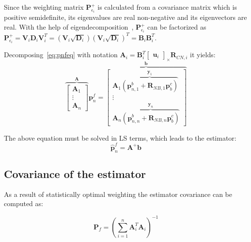 Since the weighting matrix $\mathbf{P}_{\epsilon_i}^{+}$ is calculated from a covariance matrix which is positive semidefinite, its eigenvalues are real non-negative and its eigenvectors are real. With the help of eigendecomposition~\cite{matrixtheory}, $\mathbf{P}_{\epsilon_i}^{+}$ can be factorized as $\mathbf{P}_{\epsilon_i}^{+}=\mathbf{V}_i\mathbf{D}_i\mathbf{V}_i^T = (\mathbf{V}_i\sqrt{\mathbf{D}_i}){(\mathbf{V}_i\sqrt{\mathbf{D}_i})}^T = \mathbf{B}_i\mathbf{B}_i^T$.

Decomposing~\eqref{eq:pnfeq} with notation $\mathbf{A}_i=\mathbf{B}_i^T\begin{bmatrix} \mathbf{u}_i \end{bmatrix}_\times\mathbf{R}_{CN, i}$ it yields:
\begin{equation}
    \overbrace{
    \begin{bmatrix}
        \mathbf{A}_1 \\ \vdots \\ \mathbf{A}_n
    \end{bmatrix}
    }^{\mathbf{A}} \mathbf{p}_n^f =
    \overbrace{
    \begin{bmatrix}
        \mathbf{A}_1\overbrace{(\mathbf{p}_{n, 1}^b+\mathbf{R}_{NB, 1}\mathbf{p}_b^c)}^{\mathbf{y}_1} \\ \vdots \\ \mathbf{A}_n\overbrace{(\mathbf{p}_{n, n}^b+\mathbf{R}_{NB, n}\mathbf{p}_b^c)}^{\mathbf{y}_n}
    \end{bmatrix}
    }^{\mathbf{b}}
    \label{eq:decomposed-linsys}
\end{equation}

The above equation must be solved in LS terms, which leads to the estimator:
\begin{equation}
    \hat{\mathbf{p}}_n^f = \mathbf{A}^+\mathbf{b}
    \label{eq:estimator}
\end{equation}

\subsection{Covariance of the estimator}

As a result of statistically optimal weighting the estimator covariance can be computed as:

\begin{equation}
    \mathbf{P}_{f} = {\left(\sum_{i=1}^n \mathbf{A}_i^T\mathbf{A}_i\right)}^{-1}
    \label{eq:covest}
\end{equation}

